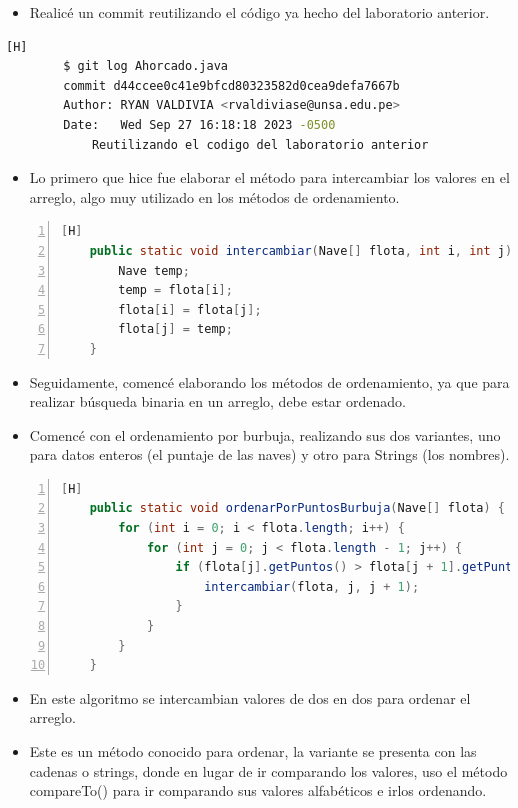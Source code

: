 \documentclass{article}
\begin{document}
	\begin{itemize}	
		\item Realicé un commit reutilizando el código ya hecho del laboratorio anterior.
	\end{itemize}	
	\begin{lstlisting}[language=bash,caption={Comentando el código parcial}][H]
		$ git log Ahorcado.java
		commit d44ccee0c41e9bfcd80323582d0cea9defa7667b
		Author: RYAN VALDIVIA <rvaldiviase@unsa.edu.pe>
		Date:   Wed Sep 27 16:18:18 2023 -0500
			Reutilizando el codigo del laboratorio anterior
	\end{lstlisting}
	\begin{itemize}	
		\item Lo primero que hice fue elaborar el método para intercambiar los valores en el arreglo, algo muy utilizado en los métodos de ordenamiento.
	\end{itemize}
	\begin{lstlisting}[language=java,caption={Intercambio}, numbers=left][H]
	public static void intercambiar(Nave[] flota, int i, int j) {
        Nave temp;
        temp = flota[i];
        flota[i] = flota[j];
        flota[j] = temp;
    }
	\end{lstlisting}
	\begin{itemize}	
		\item Seguidamente, comencé elaborando los métodos de ordenamiento, ya que para realizar búsqueda binaria en un arreglo, debe estar ordenado.
		\item Comencé con el ordenamiento por burbuja, realizando sus dos variantes, uno para datos enteros (el puntaje de las naves) y otro para Strings (los nombres).
	\end{itemize}
	\begin{lstlisting}[language=java,caption={Ordenamiento por burbuja: Enteros}, numbers=left][H]
	public static void ordenarPorPuntosBurbuja(Nave[] flota) {
        for (int i = 0; i < flota.length; i++) {
            for (int j = 0; j < flota.length - 1; j++) {
                if (flota[j].getPuntos() > flota[j + 1].getPuntos()) {
                    intercambiar(flota, j, j + 1);
                }
            }
        }
    }
	\end{lstlisting}
	\begin{itemize}	
		\item En este algoritmo se intercambian valores de dos en dos para ordenar el arreglo.
		\item Este es un método conocido para ordenar, la variante se presenta con las cadenas o strings, donde en lugar de ir comparando los valores, uso el método compareTo() para ir comparando sus valores alfabéticos e irlos ordenando.
	\end{itemize}
\end{document}

